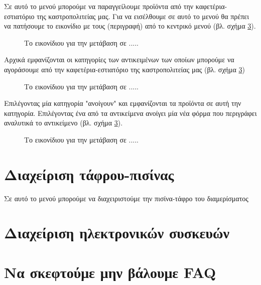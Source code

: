 \documentclass[a4paper,titlepage,twoside,12pt,leqno]{article}
\begin{document}
Σε αυτό το μενού μπορούμε να παραγγείλουμε προϊόντα από την καφετέρια-εστιατόριο της καστροπολιτείας μας. Για να εισέλθουμε σε αυτό το μενού θα πρέπει να πατήσουμε το εικονίδιο με τους (περιγραφή) από το κεντρικό μενού (βλ. σχήμα \ref{}).

\begin{figure}
\begin{center}
\resizebox*{10.5cm}{!}{
\rule{0.4\textwidth}{0.3\textwidth}}
\caption{Το εικονίδιου για την μετάβαση σε .....}
\label{fig:icon:}
\end{center}
\end{figure}

Αρχικά εμφανίζονται οι κατηγορίες των αντικειμένων των οποίων μπορούμε να αγοράσουμε από την καφετέρια-εστιατόριο της καστροπολιτείας μας (βλ. σχήμα \ref{})

\begin{figure}
\begin{center}
\resizebox*{10.5cm}{!}{
\rule{0.4\textwidth}{0.3\textwidth}}
\caption{Το εικονίδιου για την μετάβαση σε .....}
\label{fig:icon:}
\end{center}
\end{figure}

Επιλέγοντας μία κατηγορία "ανοίγουν" και εμφανίζονται τα προϊόντα σε αυτή την κατηγορία. Επιλέγοντας ένα από τα αντικείμενα ανοίγει μία νέα φόρμα που περιγράφει αναλυτικά το αντικείμενο (βλ. σχήμα \ref{}).

\begin{figure}
\begin{center}
\resizebox*{10.5cm}{!}{
\rule{0.4\textwidth}{0.3\textwidth}}
\caption{Το εικονίδιου για την μετάβαση σε .....}
\label{fig:icon:}
\end{center}
\end{figure}

\section{Διαχείριση τάφρου-πισίνας}
\label{pisina}

Σε αυτό το μενού μπορούμε να διαχειριστούμε την πισίνα-τάφρο του διαμερίσματος

\section{Διαχείριση ηλεκτρονικών συσκευών}
\label{syskeuves}



\section{Να σκεφτούμε μην βάλουμε FAQ}
\end{document}
